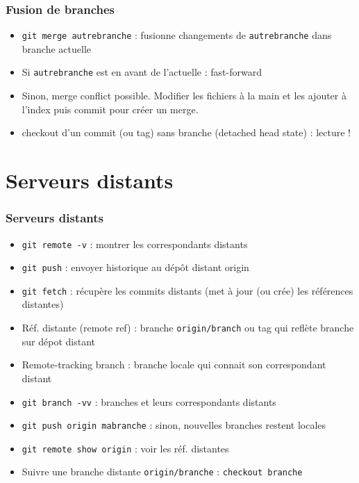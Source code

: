 \documentclass[english, french]{beamer}
\begin{document}
\begin{frame}
	\frametitle{Fusion de branches}
	{
	\centering
	\par
	}
	\begin{itemize}
		\item \texttt{git merge autrebranche} : fusionne changements de \texttt{autrebranche} dans branche actuelle
		\item Si \texttt{autrebranche} est en avant de l’actuelle : \og{}fast-forward\fg{}
		\item Sinon, \og{}merge conflict\fg{} possible. Modifier les fichiers à la main et les ajouter à l’index puis commit pour créer un merge.
		\item checkout d’un commit {\tiny (ou tag)} sans branche {\tiny (detached head state)} : lecture !
	\end{itemize}
\end{frame}

\section{Serveurs distants}
\begin{frame}
	\frametitle{Serveurs distants}
	\begin{itemize}
		\item \texttt{git remote -v} : montrer les correspondants distants
		\item \texttt{git push} : envoyer historique au dépôt distant origin
		\item \texttt{git fetch} : récupère les commits distants (met à jour (ou crée) les références distantes)
		\item Réf. distante (\og{}remote ref\fg{}) : branche \texttt{origin/branch} {\tiny ou tag} qui reflète branche sur dépot distant
		\item \og{}Remote-tracking branch\fg{} : branche locale qui connait son correspondant distant
		\item \texttt{git branch -vv} : branches et leurs correspondants distants
		\item \texttt{git push origin mabranche} : sinon, nouvelles branches restent locales
		\item \texttt{git remote show origin} : voir les réf. distantes
		\item Suivre une branche distante \texttt{origin/branche} : \texttt{checkout branche}
	\end{itemize}
\end{frame}
\end{document}
